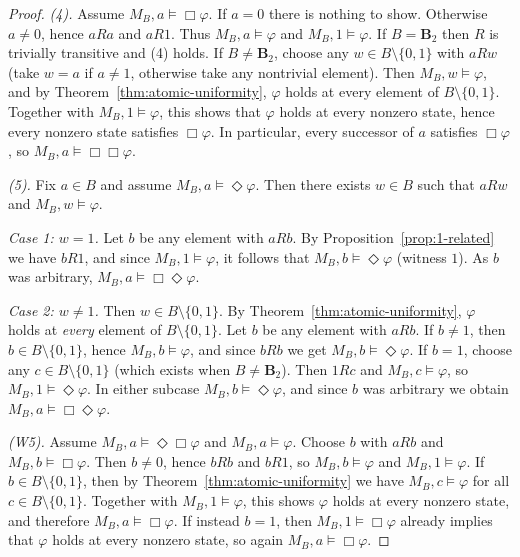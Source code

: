 \documentclass[10pt,a4paper]{amsart}
\newcommand{\Btwo}{\mathbf{B}_2}
\begin{document}
\begin{proof}
\emph{(4).}
Assume $M_B,a\models \Box\varphi$.
If $a=0$ there is nothing to show. Otherwise $a\ne 0$, hence $aRa$ and $aR1$.
Thus $M_B,a\models\varphi$ and $M_B,1\models\varphi$.
If $B=\Btwo$ then $R$ is trivially transitive and (4) holds.
If $B\ne\Btwo$, choose any $w\in B\setminus\{0,1\}$ with $aRw$ (take $w=a$ if $a\ne 1$, otherwise take any
nontrivial element). Then $M_B,w\models\varphi$, and by Theorem~\ref{thm:atomic-uniformity},
$\varphi$ holds at every element of $B\setminus\{0,1\}$.
Together with $M_B,1\models\varphi$, this shows that $\varphi$ holds at every nonzero state, hence every
nonzero state satisfies $\Box\varphi$. In particular, every successor of $a$ satisfies $\Box\varphi$, so
$M_B,a\models \Box\Box\varphi$.

\medskip\noindent
\emph{(5).}
Fix $a\in B$ and assume $M_B,a\models \Diamond\varphi$.
Then there exists $w\in B$ such that $aRw$ and $M_B,w\models \varphi$.

\smallskip\noindent\emph{Case 1: $w=1$.}
Let $b$ be any element with $aRb$.
By Proposition~\ref{prop:1-related} we have $bR1$, and since $M_B,1\models\varphi$, it follows that
$M_B,b\models\Diamond\varphi$ (witness $1$).  As $b$ was arbitrary, $M_B,a\models \Box\Diamond\varphi$.

\smallskip\noindent\emph{Case 2: $w\neq 1$.}
Then $w\in B\setminus\{0,1\}$.
By Theorem~\ref{thm:atomic-uniformity}, $\varphi$ holds at \emph{every} element of $B\setminus\{0,1\}$.
Let $b$ be any element with $aRb$.
If $b\neq 1$, then $b\in B\setminus\{0,1\}$, hence $M_B,b\models\varphi$, and since $bRb$ we get
$M_B,b\models\Diamond\varphi$.
If $b=1$, choose any $c\in B\setminus\{0,1\}$ (which exists when $B\ne \Btwo$). Then $1Rc$ and $M_B,c\models\varphi$,
so $M_B,1\models\Diamond\varphi$.
In either subcase $M_B,b\models\Diamond\varphi$, and since $b$ was arbitrary we obtain
$M_B,a\models\Box\Diamond\varphi$.

\medskip\noindent
\emph{(W5).}
Assume $M_B,a\models\Diamond\Box\varphi$ and $M_B,a\models\varphi$.
Choose $b$ with $aRb$ and $M_B,b\models \Box\varphi$.
Then $b\ne 0$, hence $bRb$ and $bR1$, so $M_B,b\models\varphi$ and $M_B,1\models\varphi$.
If $b\in B\setminus\{0,1\}$, then by Theorem~\ref{thm:atomic-uniformity} we have
$M_B,c\models\varphi$ for all $c\in B\setminus\{0,1\}$.
Together with $M_B,1\models\varphi$, this shows $\varphi$ holds at every nonzero state, and therefore
$M_B,a\models\Box\varphi$.
If instead $b=1$, then $M_B,1\models\Box\varphi$ already implies that $\varphi$ holds at every nonzero state,
so again $M_B,a\models\Box\varphi$.


\end{proof}
\end{document}
